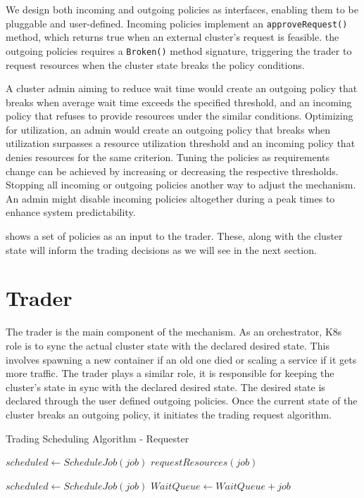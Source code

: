 We design both incoming and outgoing policies as interfaces, enabling them to
be pluggable and user-defined. Incoming policies implement an
\texttt{approveRequest()} method, which returns true when an external cluster's
request is feasible. the outgoing policies requires a \texttt{Broken()} method
signature, triggering the trader to request resources when the cluster state
breaks the policy conditions.  

A cluster admin aiming to reduce wait time would create an outgoing policy that
breaks when average wait time exceeds the specified threshold, and an incoming
policy that refuses to provide resources under the similar conditions.
Optimizing for utilization, an admin would create an outgoing policy that
breaks when utilization surpasses a resource utilization threshold and an
incoming policy that denies resources for the same criterion. Tuning the
policies as requirements change can be achieved by increasing or decreasing the
respective thresholds. Stopping all incoming or outgoing policies another way
to adjust the mechanism. An admin might disable incoming policies altogether
during a peak times to enhance system predictability.  

 shows a set of policies as an input to the trader. These, along
with the cluster state will inform the trading decisions as we will see in the
next section.

\section{Trader} \label{trader}

The trader is the main component of the mechanism. As an orchestrator, K8s role
is to sync the actual cluster state with the declared desired state. This
involves spawning a new container if an old one died or scaling a service if it
gets more traffic. The trader plays a similar role, it is responsible for
keeping the cluster's state in sync with the declared desired state. The
desired state is declared through the user defined outgoing policies. Once the
current state of the cluster breaks an outgoing policy, it initiates the
trading request algorithm. 
\begin{algorithm}[H]
\caption{Trading Scheduling Algorithm - Requester}
\begin{algorithmic}
        \State $scheduled \gets ScheduleJob(job)$
        \State $requestResources(job)$
        \EndIf
    \EndFor

        \State $scheduled \gets ScheduleJob(job)$
        \State $WaitQueue \gets WaitQueue + job$
        \EndIf
    \EndFor
\end{algorithmic}
\end{algorithm}

